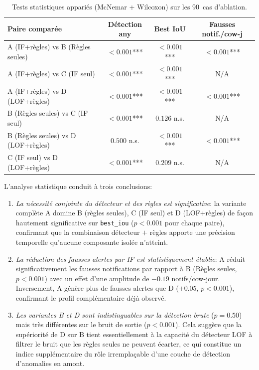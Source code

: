 \begin{table}[H]
    \centering
    \caption{Tests statistiques appariés (McNemar + Wilcoxon) sur les 90~cas d'ablation.}
    \label{tab:ablation_pvalues}
    \small
    \begin{tabular}{lccc}
        \toprule
        \textbf{Paire comparée} & \textbf{Détection any} & \textbf{Best IoU}
            & \textbf{Fausses notif./cow-j} \\
        \midrule
        A (IF+règles) vs B (Règles seules) & $<0.001$*** & $<0.001$*** & $<0.001$*** \\
        A (IF+règles) vs C (IF seul)       & $<0.001$*** & $<0.001$*** & N/A \\
        A (IF+règles) vs D (LOF+règles)    & $<0.001$*** & $<0.001$*** & $<0.001$*** \\
        B (Règles seules) vs C (IF seul)   & $<0.001$*** & $0.126$ n.s.  & N/A \\
        B (Règles seules) vs D (LOF+règles)& $0.500$ n.s.  & $<0.001$*** & $<0.001$*** \\
        C (IF seul) vs D (LOF+règles)      & $<0.001$*** & $0.209$ n.s.  & N/A \\
        \bottomrule
    \end{tabular}
\end{table}

L'analyse statistique conduit à trois conclusions:
\begin{enumerate}
    \item \textit{La nécessité conjointe du détecteur et des règles est
    significative}: la variante complète A domine B (règles seules), C (IF
    seul) et D (LOF+règles) de façon hautement significative sur \texttt{best\_iou}
    ($p<0.001$ pour chaque paire), confirmant que la combinaison détecteur $+$
    règles apporte une précision temporelle qu'aucune composante isolée
    n'atteint.
    \item \textit{La réduction des fausses alertes par IF est
    statistiquement établie}: A réduit significativement les fausses
    notifications par rapport à B (Règles seules, $p<0.001$) avec un effet
    d'une amplitude de $-0.19$ notifs/cow-jour. Inversement, A génère plus
    de fausses alertes que D ($+0.05$, $p<0.001$), confirmant le profil
    complémentaire déjà observé.
    \item \textit{Les variantes B et D sont indistinguables sur la détection
    brute} ($p=0.50$) mais très différentes sur le bruit de sortie
    ($p<0.001$). Cela suggère que la supériorité de D sur B tient
    essentiellement à la capacité du détecteur LOF à filtrer le bruit que les
    règles seules ne peuvent écarter, ce qui constitue un indice supplémentaire
    du rôle irremplaçable d'une couche de détection d'anomalies en amont.
\end{enumerate}

